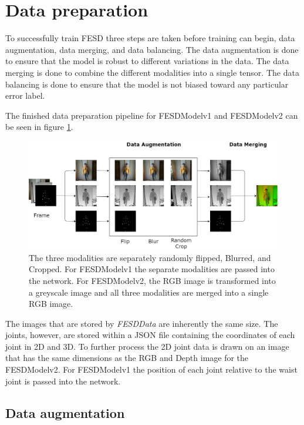 \section{Data preparation}
\label{sec:data_preparation}

To successfully train FESD three steps are taken before training can begin, data augmentation, data merging, and data balancing. The data augmentation is done to ensure that the model is robust to different variations in the data. The data merging is done to combine the different modalities into a single tensor. The data balancing is done to ensure that the model is not biased toward any particular error label.

The finished data preparation pipeline for FESDModelv1 and FESDModelv2 can be seen in figure \ref{fig:data_preparation_pipeline}.

\begin{figure}[ht]
  \centering
  \includegraphics[width=\linewidth]{figures/ProcessingPipeline/DataProcessing.png}
  \caption[Data preparation pipeline for FESDModel]{The three modalities are separately randomly flipped, Blurred, and Cropped. For FESDModelv1 the separate modalities are passed into the network. For FESDModelv2, the RGB image is transformed into a greyscale image and all three modalities are merged into a single RGB image.}
  \label{fig:data_preparation_pipeline}
\end{figure}

The images that are stored by \textit{FESDData} are inherently the same size. The joints, however, are stored within a JSON file containing the coordinates of each joint in 2D and 3D. To further process the 2D joint data is drawn on an image that has the same dimensions as the RGB and Depth image for the FESDModelv2. For FESDModelv1 the position of each joint relative to the waist joint is passed into the network.

\subsection{Data augmentation}

